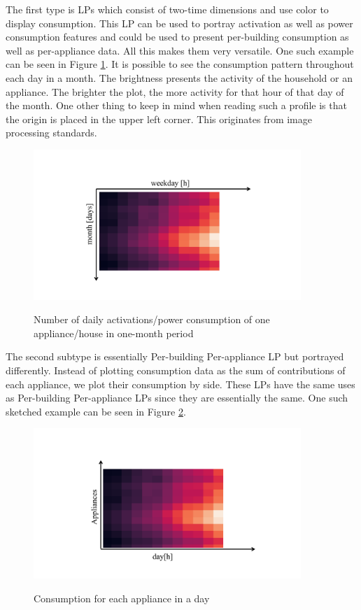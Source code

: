 The first type is LPs which consist of two-time dimensions and use color to display consumption.
This LP can be used to portray activation as well as power consumption features and could be used to present per-building consumption as well as per-appliance data.
All this makes them very versatile.
One such example can be seen in Figure \ref{fig:heatmap_2dtime}. 
It is possible to see the consumption pattern throughout each day in a month.
The brightness presents the activity of the household or an appliance. 
The brighter the plot, the more activity for that hour of that day of the month.
One other thing to keep in mind when reading such a profile is that the origin is placed in the upper left corner.
This originates from image processing standards.

\begin{figure}[H]
	\centering
	\caption{Number of daily activations/power consumption of one appliance/house in one-month period}
	\includegraphics[width=0.9\textwidth]{Figures/profile_sketches/slide10.pdf}
	\label{fig:heatmap_2dtime}
\end{figure}

The second subtype is essentially Per-building Per-appliance LP but portrayed differently.
Instead of plotting consumption data as the sum of contributions of each appliance, we plot their consumption by side.
These LPs have the same uses as Per-building Per-appliance LPs since they are essentially the same.
One such sketched example can be seen in Figure \ref{fig:heatmap_all_appl}.

\begin{figure}[H]
	\centering
	\caption{Consumption for each appliance in a day}
	\includegraphics[width=0.9\textwidth]{Figures/profile_sketches/slide12.pdf}
	\label{fig:heatmap_all_appl}
\end{figure}

